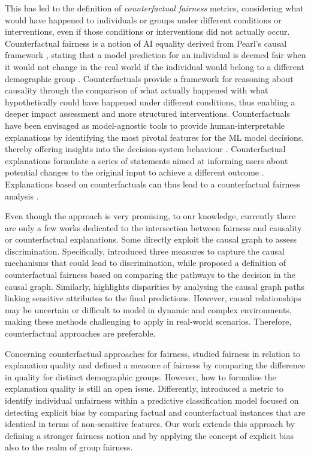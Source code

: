 \documentclass[letterpaper]{article} %
\begin{document}
This has led to the definition of \emph{counterfactual fairness} metrics, considering what would have happened to individuals or groups under different conditions or interventions, even if those conditions or interventions did not actually occur. Counterfactual fairness is a notion of AI equality derived from Pearl's causal framework \cite{pearl2009causality}, stating that a model prediction for an individual is deemed fair when it would not change in the real world if the individual would belong to a different demographic group \cite{NIPS2017_a486cd07,ijcai2019p199}. Counterfactuals provide a framework for reasoning about causality through the comparison of what actually happened with what hypothetically could have happened under different conditions, thus enabling a deeper impact assessment and more structured interventions. 
%
Counterfactuals have been envisaged as model-agnostic tools to provide human-interpretable explanations by identifying the most pivotal features for the ML model decisions, thereby offering insights into the decision-system behaviour \cite{10.1145/3236009,wachter2017counterfactual}. Counterfactual explanations formulate a series of statements aimed at informing users about potential changes to the original input to achieve a different outcome \cite{byrne2007rational}. Explanations based on counterfactuals can thus lead to a counterfactual fairness analysis \cite{artelt2019computation,karimi2021survey,guidotti2022counterfactual,verma2020counterfactual}.

Even though the approach is very promising, to our knowledge, currently there are only a few works dedicated to the intersection between fairness and causality or counterfactual explanations.
%
Some directly exploit the causal graph to assess discrimination. Specifically, \citet{Zhang_Bareinboim_2018} introduced three measures to capture the causal mechanisms that could lead to discrimination, while \citet{Chiappa_2019} proposed a definition of counterfactual fairness based on comparing the pathways to the decision in the causal graph. Similarly, \citet{pan2021explaining} highlights disparities by analysing the causal graph paths linking sensitive attributes to the final predictions. However, causal relationships may be uncertain or difficult to model in dynamic and complex environments, making these methods challenging to apply in real-world scenarios. Therefore, counterfactual approaches are preferable.

Concerning counterfactual approaches for fairness, \citet{10.1609/aaai.v37i9.26344} studied fairness in relation to explanation quality and defined a measure of fairness by comparing the difference in quality for distinct demographic groups. However, how to formalise the explanation quality is still an open issue.
%
Differently, \citet{goethals2023precof} introduced a metric to identify individual unfairness within a predictive classification model focused on detecting explicit bias by comparing factual and counterfactual instances that are identical in terms of non-sensitive features.
%
Our work extends this approach by defining a stronger fairness notion and by applying the concept of explicit bias also to the realm of group fairness.
\end{document}
